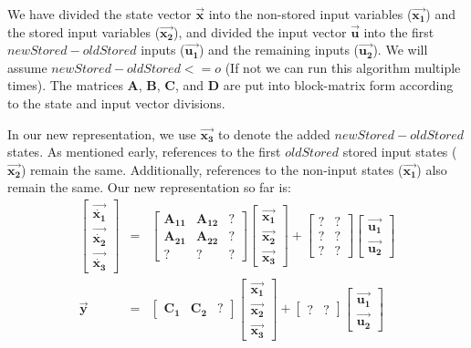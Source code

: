     We have divided the state vector $\vec{\mathbf{x}}$ into the non-stored input variables ($\vec{\mathbf{x_1}}$)
and the stored input variables ($\vec{\mathbf{x_2}}$), and divided
the input vector $\vec{\mathbf{u}}$ into the first
$newStored-oldStored$ inputs ($\vec{\mathbf{u_1}}$) and the
remaining inputs ($\vec{\mathbf{u_2}}$). We will assume
$newStored-oldStored <= o$ (If not we can run this algorithm
multiple times). The matrices $\mathbf{A}$, $\mathbf{B}$,
$\mathbf{C}$, and $\mathbf{D}$ are put into block-matrix form
according to the state and input vector divisions.

    In our new representation, we use $\vec{\mathbf{x_3}}$ to denote the
added $newStored - oldStored$ states. As mentioned early,
references to the first $oldStored$ stored input states
($\vec{\mathbf{x_2}}$) remain the same. Additionally, references
to the non-input states ($\vec{\mathbf{x_1}}$) also remain the
same. Our new representation so far is:
\begin{eqnarray*}
\left [ \begin{array} {c} \vec{\dot{\mathbf{x_1}}} \\ \vec{\dot{\mathbf{x_2}}} \\
\vec{\dot{\mathbf{x_3}}}
\end{array} \right ] & = & \left [ \begin{array} {ccc} \mathbf{A_{11}} & \mathbf{A_{12}} & ? \\
\mathbf{A_{21}} & \mathbf{A_{22}} & ? \\ ? & ? & ?
\end{array} \right ] \left [
\begin{array} {c} \vec{\mathbf{x_1}} \\ \vec{\mathbf{x_2}} \\ \vec{\mathbf{x_3}} \end{array} \right ]
 + \left [ \begin{array} {cc} ? & ? \\ ? & ? \\ ? & ? \end{array} \right ] \left[
\begin{array} {c} \vec{\mathbf{u_1}} \\ \vec{\mathbf{u_2}} \end{array} \right ] \\
\vec{\mathbf{y}} & = & \left [ \begin{array} {ccc} \mathbf{C_1} &
\mathbf{C_2} & ? \end{array} \right ] \left [
\begin{array} {c} \vec{\mathbf{x_1}} \\ \vec{\mathbf{x_2}} \\ \vec{\mathbf{x_3}} \end{array} \right ] +
\left [ \begin{array} {cc} ? & ?
\end{array} \right ] \left [ \begin{array} {c} \vec{\mathbf{u_1}} \\
\vec{\mathbf{u_2}} \end{array} \right ]
\end{eqnarray*}

